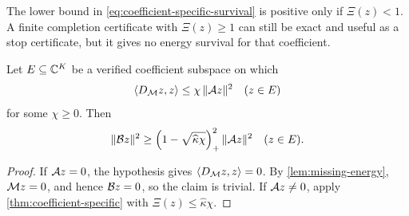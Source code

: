 \begin{remark}
The lower bound in \eqref{eq:coefficient-specific-survival} is
positive only if \(\Xi(z)<1\).  A finite completion certificate with
\(\Xi(z)\ge1\) can still be exact and useful as a stop certificate,
but it gives no energy survival for that coefficient.
\end{remark}

\begin{corollary}
\label{cor:uniform-Xi}
Let \(E\subseteq\mathbb C^K\) be a verified coefficient subspace on which
\[
 \langle D_{\mathcal M}z,z\rangle
 \le\chi\,\|\mathcal A z\|^2
 \quad(z\in E)
\]
for some \(\chi\ge0\).  Then
\[
 \|\mathcal B z\|^2
 \ge
 \left(1-\sqrt{\widehat\kappa\chi}\right)_+^2
 \|\mathcal A z\|^2
 \quad(z\in E).
\]
\end{corollary}

\begin{proof}
If \(\mathcal A z=0\), the hypothesis gives
\(\langle D_{\mathcal M}z,z\rangle=0\).  By
\cref{lem:missing-energy}, \(\mathcal M z=0\), and hence \(\mathcal B z=0\), so
the claim is trivial.  If \(\mathcal A z\ne0\), apply
\cref{thm:coefficient-specific} with
\(\Xi(z)\le\widehat\kappa\chi\).
\end{proof}
